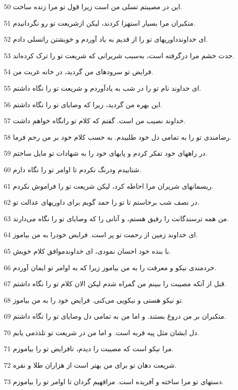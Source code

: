 \par 50 این در مصیبتم تسلی من است زیرا قول تو مرا زنده ساخت.
\par 51 متکبران مرا بسیار استهزا کردند، لیکن ازشریعت تو رو نگردانیدم.
\par 52 ‌ای خداوندداوریهای تو را از قدیم به یاد آوردم و خویشتن راتسلی دادم.
\par 53 حدت خشم مرا در‌گرفته است، به‌سبب شریرانی که شریعت تو را ترک کرده‌اند.
\par 54 فرایض تو سرودهای من گردید، در خانه غربت من.
\par 55 ‌ای خداوند نام تو را در شب به یادآوردم و شریعت تو را نگاه داشتم.
\par 56 این بهره من گردید، زیرا که وصایای تو را نگاه داشتم.
\par 57 خداوند نصیب من است. گفتم که کلام تو رانگاه خواهم داشت.
\par 58 رضامندی تو را به تمامی دل خود طلبیدم. به حسب کلام خود بر من رحم فرما. 
\par 59 در راههای خود تفکر کردم و پایهای خود را به شهادات تو مایل ساختم.
\par 60 شتابیدم ودرنگ نکردم تا اوامر تو را نگاه دارم.
\par 61 ریسمانهای شریران مرا احاطه کرد، لیکن شریعت تو را فراموش نکردم.
\par 62 در نصف شب برخاستم تا تو را حمد گویم برای داوریهای عدالت تو.
\par 63 من همه ترسندگانت را رفیق هستم، و آنانی را که وصایای تو را نگاه می‌دارند.
\par 64 ‌ای خداوند زمین از رحمت تو پر است. فرایض خودرا به من بیاموز.
\par 65 با بنده خود احسان نمودی، ای خداوندموافق کلام خویش.
\par 66 خردمندی نیکو و معرفت را به من بیاموز زیرا که به اوامر تو ایمان آوردم.
\par 67 قبل از آنکه مصیبت را ببینم من گمراه شدم لیکن الان کلام تو را نگاه داشتم.
\par 68 تو نیکو هستی و نیکویی می‌کنی. فرایض خود را به من بیاموز.
\par 69 متکبران بر من دروغ بستند. و اما من به تمامی دل وصایای تو را نگاه داشتم.
\par 70 دل ایشان مثل پیه فربه است. و اما من در شریعت تو تلذذمی یابم.
\par 71 مرا نیکو است که مصیبت را دیدم، تافرایض تو را بیاموزم.
\par 72 شریعت دهان تو برای من بهتر است از هزاران طلا و نقره.
\par 73 دستهای تو مرا ساخته و آفریده است. مرافهیم گردان تا اوامر تو را بیاموزم.
